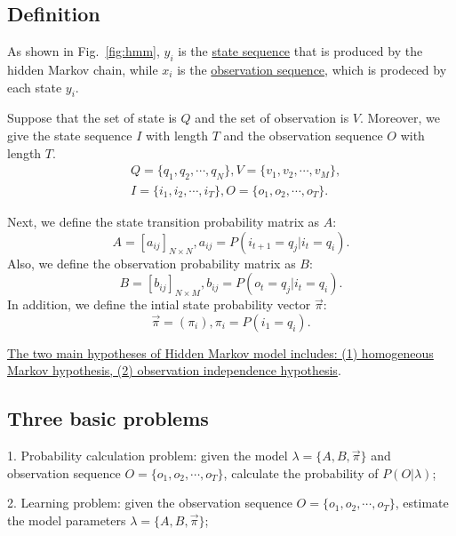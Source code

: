 \documentclass[10pt,onecolumn]{book}
\begin{document}
\subsection{Definition}
As shown in Fig.~\ref{fig:hmm}, $y_i$ is the \uline{state sequence} that is produced by the hidden Markov chain, while $x_i$ is the \uline{observation sequence}, which is prodeced by each state $y_i$.

Suppose that the set of state is $Q$ and the set of observation is $V$. Moreover, we give the state sequence $I$ with length $T$ and the observation sequence $O$ with length $T$.
\begin{equation}
\begin{split}
& Q = \{q_1, q_2, \cdots, q_N\}, V = \{v_1, v_2, \cdots, v_M\}, \\
& I = \{i_1, i_2, \cdots, i_T\}, O = \{o_1, o_2, \cdots, o_T\}.
\end{split}
\end{equation}

Next, we define the state transition probability matrix as $A$:
\begin{equation}
A = \left[ a_{ij} \right]_{N \times N}, a_{ij} = P(i_{t+1} = q_j|i_t = q_i).
\end{equation}
Also, we define the observation probability matrix as $B$:
\begin{equation}
B = \left[ b_{ij} \right]_{N \times M}, b_{ij} = P(o_{t} = q_j|i_t = q_i).
\end{equation}
In addition, we define the intial state probability vector $\vec{\pi}$:
\begin{equation}
\vec{\pi} = (\pi_i), \pi_i = P(i_1 = q_i).
\end{equation}

\uline{The two main hypotheses of Hidden Markov model includes: (1) homogeneous Markov hypothesis, (2) observation independence hypothesis}.

\subsection{Three basic problems}
1. Probability calculation problem: given the model $\lambda = \{A, B, \vec{\pi}\}$ and observation sequence $O = \{o_1, o_2, \cdots, o_T\}$, calculate the probability of $P(O|\lambda)$; 

2. Learning problem: given the observation sequence $O = \{o_1, o_2, \cdots, o_T\}$, estimate the model parameters $\lambda = \{A, B, \vec{\pi}\}$;
\end{document}
